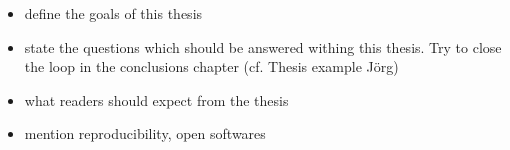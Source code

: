 \begin{itemize}
\itemsep0em
  \item define the goals of this thesis
  \item state the questions which should be answered withing this thesis. Try to close the loop in the conclusions chapter (cf. Thesis example Jörg)
  \item what readers should expect from the thesis
  \item mention reproducibility, open softwares
\end{itemize}








